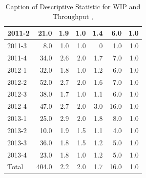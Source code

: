 \documentclass[UKenglish]{ifimaster}  %
\begin{document}
\begin{table}[!htbp]
\begin{adjustwidth}{-2.5cm}{}
{{\begin{tabular}{ | l | r | r | r | r | r | r | }
2011-2 & 21.0 & 1.9 & 1.0 & 1.4 & 6.0 & 1.0\\ \hline
2011-3 & 8.0 & 1.0 & 1.0 & 0 & 1.0 & 1.0\\ \hline
2011-4 & 34.0 & 2.6 & 2.0 & 1.7 & 7.0 & 1.0\\ \hline
2012-1 & 32.0 & 1.8 & 1.0 & 1.2 & 6.0 & 1.0\\ \hline
2012-2 & 52.0 & 2.7 & 2.0 & 1.6 & 7.0 & 1.0\\ \hline
2012-3 & 38.0 & 1.7 & 1.0 & 1.1 & 6.0 & 1.0\\ \hline
2012-4 & 47.0 & 2.7 & 2.0 & 3.0 & 16.0 & 1.0\\ \hline
2013-1 & 25.0 & 2.9 & 2.0 & 1.8 & 8.0 & 1.0\\ \hline
2013-2 & 10.0 & 1.9 & 1.5 & 1.1 & 4.0 & 1.0\\ \hline
2013-3 & 36.0 & 1.8 & 1.5 & 1.2 & 5.0 & 1.0\\ \hline
2013-4 & 23.0 & 1.8 & 1.0 & 1.2 & 5.0 & 1.0\\ \hline
Total & 404.0 & 2.2 & 2.0 & 1.7 & 16.0 & 1.0\\ \hline
\end{tabular}
}
}
\end{adjustwidth}
\caption[Optional caption for list of figures]{Caption of Descriptive Statistic for WIP and Throughput  , }
\label{DS:10:1}
\end{table}
\end{document}
